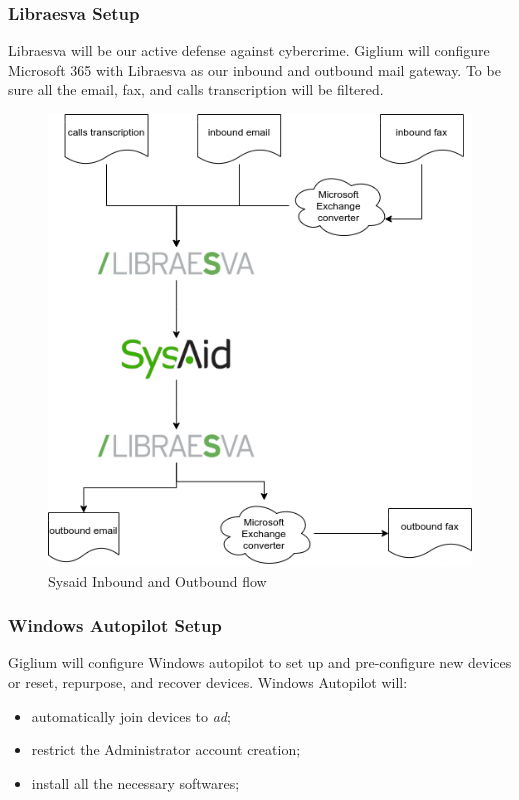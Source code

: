 \subsubsection{Libraesva Setup}\label{libraesva_setup}
Libraesva will be our active defense against cybercrime. Giglium will configure Microsoft 365 with Libraesva as our inbound and outbound mail gateway. To be sure all the email, fax, and calls transcription will be filtered. 

\begin{figure}[ht!]
	\centering
	\includegraphics[width=120mm]{./img/implementations/io.png}
	\caption{Sysaid Inbound and Outbound flow}\label{fig:sysaid-flow}
\end{figure}

\subsubsection{Windows Autopilot Setup}\label{autopilot_setup}
Giglium will configure Windows autopilot to set up and pre-configure new devices or reset, repurpose, and recover devices. Windows Autopilot will:

\begin{itemize}
	\item automatically join devices to \textit{\gls{ad}};
	\item restrict the Administrator account creation;
	\item install all the necessary softwares;
\end{itemize}

